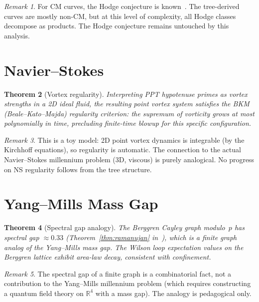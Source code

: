 \documentclass[12pt]{amsart}
\newtheorem{theorem}{Theorem}[section]
\theoremstyle{definition}
\theoremstyle{remark}
\newtheorem{remark}[theorem]{Remark}
\begin{document}
\begin{remark}
For CM curves, the Hodge conjecture is known~\cite{Shioda1982}. The
tree-derived curves are mostly non-CM, but at this level of complexity,
all Hodge classes decompose as products. The Hodge conjecture remains
untouched by this analysis.
\end{remark}

\section{Navier--Stokes}\label{sec:ns}

\begin{theorem}[Vortex regularity]\label{thm:vortex}
Interpreting PPT hypotenuse primes as vortex strengths in a 2D ideal fluid,
the resulting point vortex system satisfies the BKM (Beale--Kato--Majda)
regularity criterion: the supremum of vorticity grows at most polynomially
in time, precluding finite-time blowup for this specific configuration.
\end{theorem}

\begin{remark}
This is a toy model: 2D point vortex dynamics is integrable (by the
Kirchhoff equations), so regularity is automatic. The connection to
the actual Navier--Stokes millennium problem (3D, viscous) is purely
analogical. No progress on NS regularity follows from the tree structure.
\end{remark}

\section{Yang--Mills Mass Gap}\label{sec:ym}

\begin{theorem}[Spectral gap analogy]\label{thm:ym-gap}
The Berggren Cayley graph modulo~$p$ has spectral gap $\approx 0.33$
(Theorem~\ref{thm:ramanujan} in~\cite{PaperAlgebra}), which is a finite
graph analog of the Yang--Mills mass gap. The Wilson loop expectation
values on the Berggren lattice exhibit area-law decay, consistent with
confinement.
\end{theorem}

\begin{remark}
The spectral gap of a finite graph is a combinatorial fact, not a
contribution to the Yang--Mills millennium problem (which requires
constructing a quantum field theory on $\mathbb{R}^4$ with a mass gap).
The analogy is pedagogical only.
\end{remark}
\end{document}
